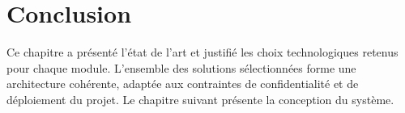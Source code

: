 \section*{Conclusion}

Ce chapitre a présenté l'état de l'art et justifié les choix technologiques
retenus pour chaque module. L'ensemble des solutions sélectionnées forme une architecture
cohérente, adaptée aux contraintes de confidentialité et de déploiement du projet.
Le chapitre suivant présente la conception du système.
